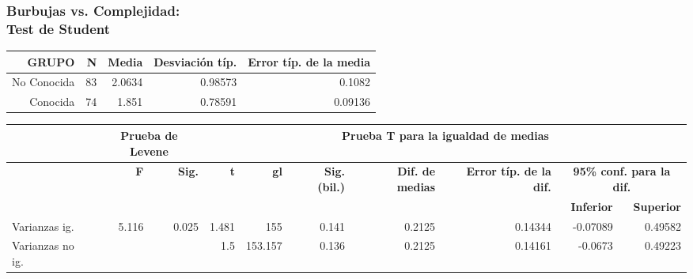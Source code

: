 \documentclass[10pt]{beamer}
\begin{document}
      \begin{frame}
      \tiny
	  \frametitle{Burbujas vs. Complejidad:\\Test de Student}
	\begin{table}
	  \begin{tabular}[t]{|r|r|r|r|r|}
	    \hline
		\textbf{GRUPO} & \textbf{N} & \textbf{Media} & \textbf{Desviación típ.} & \textbf{Error típ. de la media} \\ \hline
		No Conocida &  83 & 2.0634 & 0.98573 & 0.1082 \\ \hline
		Conocida & 74 & 1.851 & 0.78591 & 0.09136 \\ \hline
	  \end{tabular}
	  \begin{tabular}[t]{|l|r|r|r|r|r|r|r|r|r|}
	    \hline
		  & \multicolumn{2}{|c|}{\textbf{Prueba de Levene}} &  \multicolumn{7}{|c|}{\textbf{Prueba T para la igualdad de medias}} \\ \hline
		  & \textbf{F} & \textbf{Sig.} & \textbf{t} & \textbf{gl} & \textbf{Sig. (bil.)} & \textbf{Dif. de medias} & \textbf{Error típ. de la dif.} & \multicolumn{2}{|c|}{\textbf{95\% conf. para la dif.}} \\ \hline
		  &   &   &   &   &   &   &   & \textbf{Inferior} & \textbf{Superior} \\ \hline
		Varianzas ig. & 5.116 & 0.025 & 1.481 & 155 & 0.141 & 0.2125 & 0.14344 & -0.07089 & 0.49582 \\ \hline
		Varianzas no ig. &   &   &  1.5 & 153.157 & 0.136 & 0.2125 & 0.14161 & -0.0673 & 0.49223 \\ \hline
	  \end{tabular}
	\end{table}


\end{frame}
\end{document}

